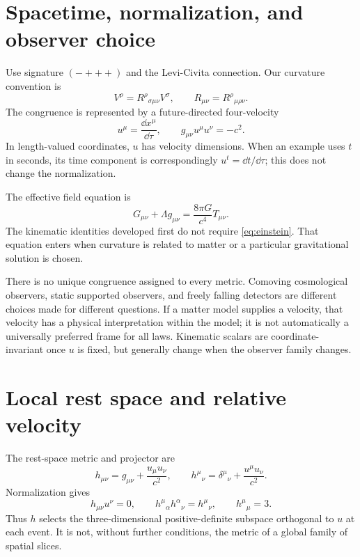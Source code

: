\documentclass[11pt]{article}
\begin{document}
\section{Spacetime, normalization, and observer choice}
Use signature $(-+++)$ and the Levi-Civita connection. Our curvature convention is
\begin{equation}
[\nabla_\mu,\nabla_\nu]V^\rho=R^\rho{}_{\sigma\mu\nu}V^\sigma,
\qquad R_{\mu\nu}=R^\rho{}_{\mu\rho\nu}.
\end{equation}
The congruence is represented by a future-directed four-velocity
\begin{equation}
u^\mu=\frac{\dd x^\mu}{\dd\tau},\qquad g_{\mu\nu}u^\mu u^\nu=-c^2.
\label{eq:unitnorm}
\end{equation}
In length-valued coordinates, $u$ has velocity dimensions. When an example uses $t$ in seconds, its time component is correspondingly $u^t=\dd t/\dd\tau$; this does not change the normalization.

The effective field equation is
\begin{equation}
G_{\mu\nu}+\Lambda g_{\mu\nu}=\frac{8\pi G}{c^4}T_{\mu\nu}.
\label{eq:einstein}
\end{equation}
The kinematic identities developed first do not require \eqref{eq:einstein}. That equation enters when curvature is related to matter or a particular gravitational solution is chosen.

There is no unique congruence assigned to every metric. Comoving cosmological observers, static supported observers, and freely falling detectors are different choices made for different questions. If a matter model supplies a velocity, that velocity has a physical interpretation within the model; it is not automatically a universally preferred frame for all laws. Kinematic scalars are coordinate-invariant once $u$ is fixed, but generally change when the observer family changes.

\section{Local rest space and relative velocity}
The rest-space metric and projector are
\begin{equation}
h_{\mu\nu}=g_{\mu\nu}+\frac{u_\mu u_\nu}{c^2},\qquad
h^\mu{}_{\nu}=\delta^\mu{}_{\nu}+\frac{u^\mu u_\nu}{c^2}.
\label{eq:projector}
\end{equation}
Normalization gives
\begin{equation}
h_{\mu\nu}u^\nu=0,\qquad
h^\mu{}_{\alpha}h^\alpha{}_{\nu}=h^\mu{}_{\nu},\qquad
h^\mu{}_{\mu}=3.
\label{eq:projectorprops}
\end{equation}
Thus $h$ selects the three-dimensional positive-definite subspace orthogonal to $u$ at each event. It is not, without further conditions, the metric of a global family of spatial slices.
\end{document}
